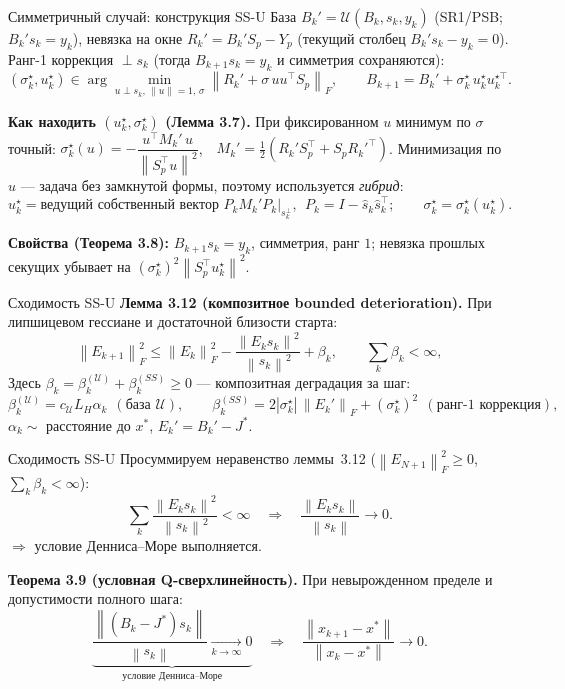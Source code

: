 \documentclass[aspectratio=169,11pt,t]{beamer}
\newcommand{\Fn}[1]{\left\|#1\right\|_F}
\newcommand{\nrm}[1]{\left\|#1\right\|}
\begin{document}
\begin{frame}{Симметричный случай: конструкция SS-U}
\small
База \(B_k'=\mathcal{U}(B_k,s_k,y_k)\) (SR1/PSB; \(B_k's_k=y_k\)), невязка на окне
\(R_k'=B_k'S_p-Y_p\) (текущий столбец \(B_k's_k-y_k=0\)). Ранг-1 коррекция \(\perp s_k\)
(тогда \(B_{k+1}s_k=y_k\) и симметрия сохраняются):
\[ (\sigma_k^\star,u_k^\star)\in\arg\min_{u\perp s_k,\,\nrm{u}=1,\,\sigma}
   \Fn{R_k'+\sigma\,uu^\top S_p},\qquad B_{k+1}=B_k'+\sigma_k^\star\,u_k^\star u_k^{\star\top}. \]

\textbf{Как находить \((u_k^\star,\sigma_k^\star)\) (Лемма 3.7).} При фиксированном \(u\)
минимум по \(\sigma\) точный: \(\sigma_k^\star(u)=-\dfrac{u^\top M_k'\,u}{\nrm{S_p^\top u}^2}\),\ \
\(M_k'=\tfrac12(R_k'S_p^\top+S_pR_k'^{\top})\). Минимизация по \(u\) — задача без
замкнутой формы, поэтому используется \emph{гибрид}:
\[ u_k^\star=\text{ведущий собственный вектор }P_kM_k'P_k\big|_{s_k^\perp},\ \
   P_k=I-\hat s_k\hat s_k^\top;\qquad \sigma_k^\star=\sigma_k^\star(u_k^\star). \]

\smallskip
\textbf{Свойства (Теорема 3.8):} \(B_{k+1}s_k=y_k\), симметрия, ранг \(1\); невязка прошлых
секущих убывает на \((\sigma_k^\star)^2\nrm{S_p^\top u_k^\star}^2\).
\end{frame}

\begin{frame}{Сходимость SS-U}
\textbf{Лемма 3.12 (композитное bounded deterioration).} При липшицевом гессиане и
достаточной близости старта:
\[ \Fn{E_{k+1}}^2\le\Fn{E_k}^2-\frac{\nrm{E_ks_k}^2}{\nrm{s_k}^2}+\beta_k,
   \qquad \sum_{k}\beta_k<\infty, \]
Здесь \(\beta_k=\beta_k^{(\mathcal U)}+\beta_k^{(SS)}\ge0\) — композитная деградация за шаг:
\[ \beta_k^{(\mathcal U)}=c_{\mathcal U}L_H\alpha_k\ \ (\text{база }\mathcal U),\qquad
   \beta_k^{(SS)}=2|\sigma_k^\star|\,\Fn{E_k'}+(\sigma_k^\star)^2\ \ (\text{ранг-1 коррекция}), \]
\(\alpha_k\sim\) расстояние до \(x^*\), \(E_k'=B_k'-J^*\). 
\end{frame}

\begin{frame}{Сходимость SS-U}
Просуммируем неравенство
леммы~3.12 (\(\Fn{E_{N+1}}^2\ge0\), \(\sum_k\beta_k<\infty\)):
\[ \sum_k\frac{\nrm{E_ks_k}^2}{\nrm{s_k}^2}<\infty
   \quad\Rightarrow\quad \frac{\nrm{E_ks_k}}{\nrm{s_k}}\to0. \]
\(\Rightarrow\) условие Денниса–Море выполняется.

\medskip
\textbf{Теорема 3.9 (условная Q-сверхлинейность).} При невырожденном пределе и
допустимости полного шага:
\[ \underbrace{\frac{\nrm{(B_k-J^*)s_k}}{\nrm{s_k}}\xrightarrow[k\to\infty]{}0}_{\text{условие Денниса–Море}}
   \quad\Rightarrow\quad \frac{\nrm{x_{k+1}-x^*}}{\nrm{x_k-x^*}}\to 0. \]
\end{frame}
\end{document}
